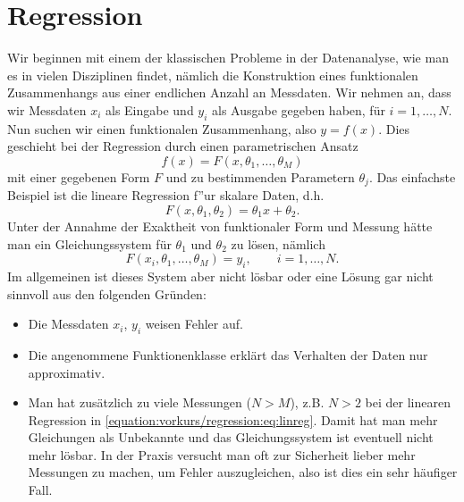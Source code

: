 \documentclass[letterpaper,10pt,english]{jupyterBook}
\begin{document}
\section{Regression}
\label{\detokenize{vorkurs/regression:regression}}\label{\detokenize{vorkurs/regression::doc}}
Wir beginnen mit einem der klassischen Probleme in der Datenanalyse, wie man es in vielen Disziplinen findet, nämlich die Konstruktion eines funktionalen Zusammenhangs aus einer endlichen Anzahl an Messdaten. Wir nehmen an, dass
wir Messdaten \(x_i\) als Eingabe und \(y_i\) als Ausgabe gegeben haben, für \(i=1,\ldots, N\). Nun suchen wir einen funktionalen Zusammenhang, also \(y=f(x)\). Dies geschieht bei der Regression durch einen parametrischen Ansatz
\begin{equation*}
 f(x) = F(x,\theta_1,\ldots,\theta_M)\end{equation*}
mit einer gegebenen Form \(F\) und   zu bestimmenden Parametern \(\theta_j\). Das einfachste Beispiel ist die lineare Regression f”ur skalare Daten, d.h.
\begin{equation}\label{equation:vorkurs/regression:eq:linreg}
F(x,\theta_1,\theta_2) = \theta_1 x + \theta_2 .
\end{equation}
Unter der Annahme der Exaktheit von funktionaler Form und Messung hätte man ein Gleichungssystem für \(\theta_1\) und \(\theta_2\) zu lösen, nämlich
\begin{equation}\label{equation:vorkurs/regression:eq:nonlinreg}
 F(x_i,\theta_1,\ldots,\theta_M) = y_i, \qquad i=1,\ldots,N. 
\end{equation}
Im allgemeinen ist dieses System aber nicht lösbar oder eine Lösung gar nicht sinnvoll aus den folgenden Gründen:
\begin{itemize}
\item {} 
Die Messdaten \(x_i\), \(y_i\) weisen Fehler auf.

\item {} 
Die angenommene Funktionenklasse erklärt das Verhalten der Daten nur approximativ.

\item {} 
Man hat zusätzlich zu viele Messungen (\(N > M\)), z.B. \(N > 2\) bei der linearen Regression in \eqref{equation:vorkurs/regression:eq:linreg}. Damit hat man mehr Gleichungen als Unbekannte und das Gleichungssystem ist eventuell nicht mehr lösbar. In der Praxis versucht man oft zur Sicherheit lieber mehr Messungen zu machen, um Fehler auszugleichen, also ist dies ein sehr häufiger Fall.

\end{itemize}
\end{document}
